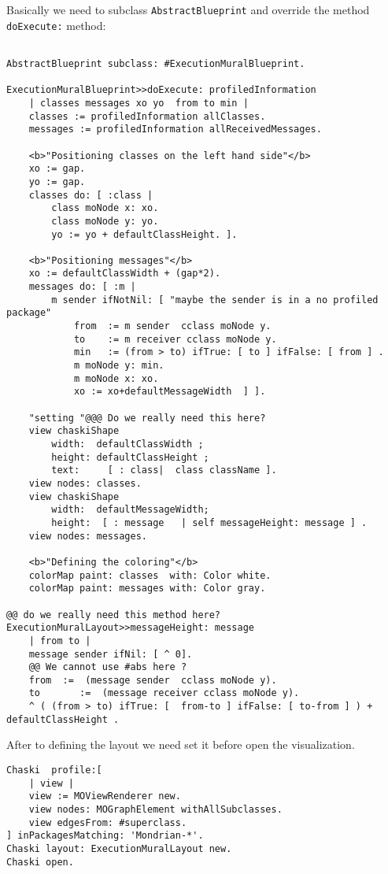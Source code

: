 \documentclass{sig-alternate}
\newcommand{\ct}{\lstinline[backgroundcolor=\color{white},basicstyle=\footnotesize\ttfamily]}
\begin{document}
Basically we need to subclass \ct{AbstractBlueprint} and override the method \ct{doExecute:} method:
\begin{lstlisting}[]%[language=Smalltalk]

AbstractBlueprint subclass: #ExecutionMuralBlueprint.

ExecutionMuralBlueprint>>doExecute: profiledInformation
	| classes messages xo yo  from to min |
	classes := profiledInformation allClasses.
	messages := profiledInformation allReceivedMessages.
	
	<b>"Positioning classes on the left hand side"</b>
	xo := gap.
	yo := gap.
	classes do: [ :class | 
		class moNode x: xo.   
		class moNode y: yo.
		yo := yo + defaultClassHeight. ].
		
	<b>"Positioning messages"</b>
	xo := defaultClassWidth + (gap*2).
	messages do: [ :m | 
		m sender ifNotNil: [ "maybe the sender is in a no profiled package"
			from  := m sender  cclass moNode y.
			to    := m receiver cclass moNode y.
			min   := (from > to) ifTrue: [ to ] ifFalse: [ from ] .
			m moNode y: min.
			m moNode x: xo.
			xo := xo+defaultMessageWidth  ] ].
	
	"setting "@@@ Do we really need this here?
	view chaskiShape 
		width:  defaultClassWidth ;
		height: defaultClassHeight ;
		text:     [ : class|  class className ].
	view nodes: classes.
	view chaskiShape 
		width:  defaultMessageWidth;
		height:  [ : message   | self messageHeight: message ] .
	view nodes: messages.
	
	<b>"Defining the coloring"</b>
	colorMap paint: classes  with: Color white.
	colorMap paint: messages with: Color gray.

@@ do we really need this method here?
ExecutionMuralLayout>>messageHeight: message
	| from to |
	message sender ifNil: [ ^ 0]. 
	@@ We cannot use #abs here ?
	from  :=  (message sender  cclass moNode y).
	to       :=  (message receiver cclass moNode y).
	^ ( (from > to) ifTrue: [  from-to ] ifFalse: [ to-from ] ) + defaultClassHeight .
\end{lstlisting}

After to defining the layout we need set it before open the visualization. 
\begin{lstlisting}[language=Smalltalk]
Chaski  profile:[
	| view |
	view := MOViewRenderer new.
	view nodes: MOGraphElement withAllSubclasses.
	view edgesFrom: #superclass.
] inPackagesMatching: 'Mondrian-*'.
Chaski layout: ExecutionMuralLayout new.
Chaski open.
\end{lstlisting}
\end{document}
